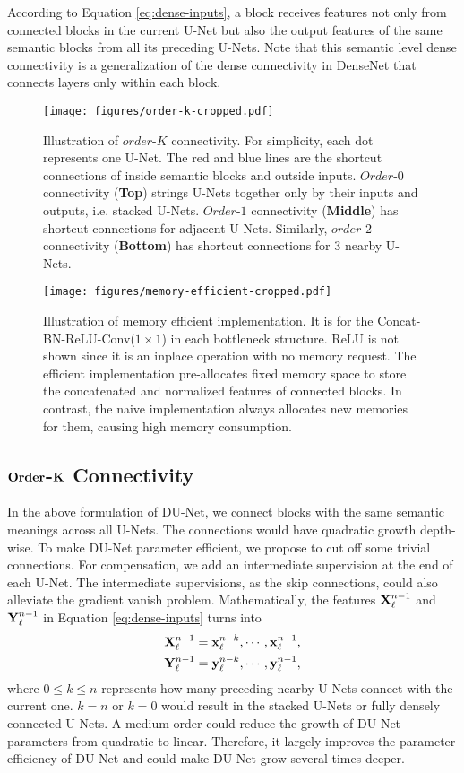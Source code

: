 \documentclass[runningheads]{llncs}
\begin{document}
According to Equation \ref{eq:dense-inputs}, a block receives features not only from connected blocks in the current U-Net but also the output features of the same semantic blocks from all its preceding U-Nets. Note that this semantic level dense connectivity is a generalization of the dense connectivity in DenseNet \cite{huang2016densely} that connects layers only within each block.

\begin{figure}[t]
\centering
  \texttt{[image: figures/order-k-cropped.pdf]}
\caption{Illustration of $order$-$K$ connectivity. For simplicity, each dot represents one U-Net. The red and blue lines are the shortcut connections of inside semantic blocks and outside inputs. $Order$-$0$ connectivity ({\bf Top}) strings U-Nets together only by their inputs and outputs, i.e. stacked U-Nets. $Order$-$1$ connectivity ({\bf Middle}) has shortcut connections for adjacent U-Nets. Similarly, $order$-$2$ connectivity ({\bf Bottom}) has shortcut connections for 3 nearby U-Nets.}
\label{fig:$order$-$K$-illustr}
\endminipage \hfill
{}
\centering
  \texttt{[image: figures/memory-efficient-cropped.pdf]}
\caption{Illustration of memory efficient implementation. It is for the Concat-BN-ReLU-Conv($1\times 1$) in each bottleneck structure. ReLU is not shown since it is an inplace operation with no memory request. The efficient implementation  pre-allocates fixed memory space to store the concatenated and normalized features of connected blocks. In contrast, the naive implementation always allocates new memories for them, causing high memory consumption.}
  \label{fig:memory-efficient} \hfill
\endminipage
\end{figure}



\subsection{${\bf Order}$-${\bf K}$ Connectivity}
In the above formulation of DU-Net, we connect blocks with the same semantic meanings across all U-Nets. The connections would have quadratic growth depth-wise. To make DU-Net parameter efficient, we propose to cut off some trivial connections. For compensation, we add an intermediate supervision at the end of each U-Net. The intermediate supervisions, as the skip connections, could also alleviate the gradient vanish problem. Mathematically, the features  ${\bf X}_\ell^{n-1}$ and ${\bf Y}_\ell^{n-1}$ in Equation \ref{eq:dense-inputs} turns into 
\begin{gather}
    {\bf X}_{\ell}^{n-1}={\bf x}_{\ell}^{n-k},\cdots,{\bf x}_{\ell}^{n-1},\\
    {\bf Y}_{\ell}^{n-1}={\bf y}_{\ell}^{n-k},\cdots,{\bf y}_{\ell}^{n-1},
\end{gather}
where $0\leq k\leq n$ represents how many preceding nearby U-Nets connect with the current one. $k=n$ or $k=0$ would result in the stacked U-Nets or fully densely connected U-Nets. A medium order could reduce the growth of DU-Net parameters from quadratic to linear. Therefore, it largely improves the parameter efficiency of DU-Net and could make DU-Net grow several times deeper.
\end{document}
